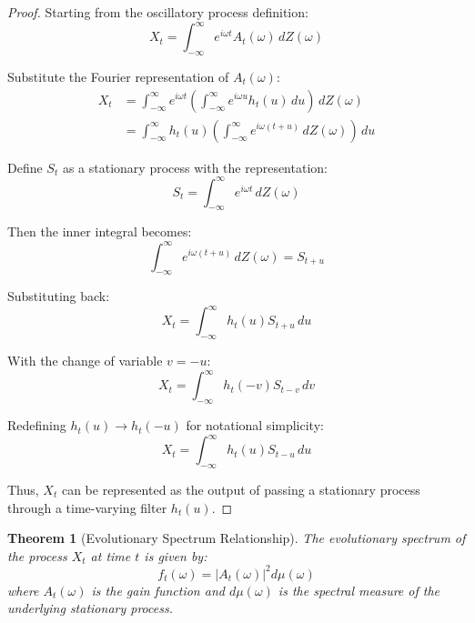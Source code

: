 \documentclass{article}
\newtheorem{theorem}{Theorem}
\theoremstyle{definition}
\begin{document}
\begin{proof}
Starting from the oscillatory process definition:
\begin{equation}
X_t = \int_{-\infty}^{\infty} e^{i\omega t} A_t(\omega) \, dZ(\omega)
\end{equation}

Substitute the Fourier representation of $A_t(\omega)$:
\begin{align}
X_t &= \int_{-\infty}^{\infty} e^{i\omega t} \left(\int_{-\infty}^{\infty} e^{i\omega u} h_t(u) \, du\right) \, dZ(\omega) \\
&= \int_{-\infty}^{\infty} h_t(u) \left(\int_{-\infty}^{\infty} e^{i\omega(t+u)} \, dZ(\omega)\right) \, du
\end{align}

Define $S_t$ as a stationary process with the representation:
\begin{equation}
S_t = \int_{-\infty}^{\infty} e^{i\omega t} \, dZ(\omega)
\end{equation}

Then the inner integral becomes:
\begin{equation}
\int_{-\infty}^{\infty} e^{i\omega(t+u)} \, dZ(\omega) = S_{t+u}
\end{equation}

Substituting back:
\begin{equation}
X_t = \int_{-\infty}^{\infty} h_t(u) S_{t+u} \, du
\end{equation}

With the change of variable $v = -u$:
\begin{equation}
X_t = \int_{-\infty}^{\infty} h_t(-v) S_{t-v} \, dv
\end{equation}

Redefining $h_t(u) \rightarrow h_t(-u)$ for notational simplicity:
\begin{equation}
X_t = \int_{-\infty}^{\infty} h_t(u) S_{t-u} \, du
\end{equation}

Thus, $X_t$ can be represented as the output of passing a stationary process through a time-varying filter $h_t(u)$.
\end{proof}

\begin{theorem}[Evolutionary Spectrum Relationship]
The evolutionary spectrum of the process $X_t$ at time $t$ is given by:
\begin{equation}
f_t(\omega) = |A_t(\omega)|^2 d\mu(\omega)
\end{equation}
where $A_t(\omega)$ is the gain function and $d\mu(\omega)$ is the spectral measure of the underlying stationary process.
\end{theorem}
\end{document}
